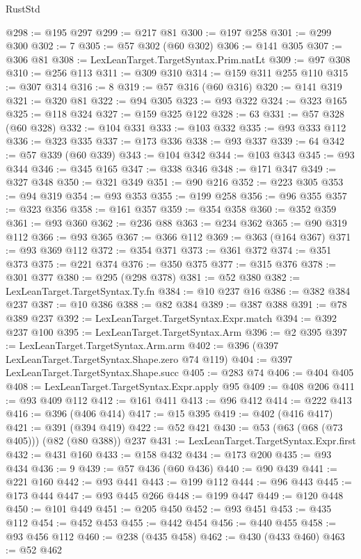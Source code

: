 \begin{lexlean}{RustStd}
\begin{coremodule}
@298 := @195 @297
@299 := @217 @81
@300 := @197 @258
@301 := @299 @300
@302 := 7
@305 := @57 @302 (@60 @302)
@306 := @141 @305
@307 := @306 @81
@308 := LexLeanTarget.TargetSyntax.Prim.natLt
@309 := @97 @308
@310 := @256 @113
@311 := @309 @310
@314 := @159 @311 @255 @110
@315 := @307 @314
@316 := 8
@319 := @57 @316 (@60 @316)
@320 := @141 @319
@321 := @320 @81
@322 := @94 @305
@323 := @93 @322
@324 := @323 @165
@325 := @118 @324
@327 := @159 @325 @122
@328 := 63
@331 := @57 @328 (@60 @328)
@332 := @104 @331
@333 := @103 @332
@335 := @93 @333 @112
@336 := @323 @335
@337 := @173 @336
@338 := @93 @337
@339 := 64
@342 := @57 @339 (@60 @339)
@343 := @104 @342
@344 := @103 @343
@345 := @93 @344
@346 := @345 @165
@347 := @338 @346
@348 := @171 @347
@349 := @327 @348
@350 := @321 @349
@351 := @90 @216
@352 := @223 @305
@353 := @94 @319
@354 := @93 @353
@355 := @199 @258
@356 := @96 @355
@357 := @323 @356
@358 := @161 @357
@359 := @354 @358
@360 := @352 @359
@361 := @93 @360
@362 := @236 @88
@363 := @234 @362
@365 := @90 @319 @112
@366 := @93 @365
@367 := @366 @112
@369 := @363 (@164 @367)
@371 := @93 @369 @112
@372 := @354 @371
@373 := @361 @372
@374 := @351 @373
@375 := @221 @374
@376 := @350 @375
@377 := @315 @376
@378 := @301 @377
@380 := @295 (@298 @378)
@381 := @52 @380
@382 := LexLeanTarget.TargetSyntax.Ty.fn
@384 := @10 @237 @16
@386 := @382 @384 @237
@387 := @10 @386
@388 := @82 @384
@389 := @387 @388
@391 := @78 @389 @237
@392 := LexLeanTarget.TargetSyntax.Expr.match
@394 := @392 @237 @100
@395 := LexLeanTarget.TargetSyntax.Arm
@396 := @2 @395
@397 := LexLeanTarget.TargetSyntax.Arm.arm
@402 := @396 (@397 LexLeanTarget.TargetSyntax.Shape.zero @74 @119)
@404 := @397 LexLeanTarget.TargetSyntax.Shape.succ
@405 := @283 @74
@406 := @404 @405
@408 := LexLeanTarget.TargetSyntax.Expr.apply @95
@409 := @408 @206
@411 := @93 @409 @112
@412 := @161 @411
@413 := @96 @412
@414 := @222 @413
@416 := @396 (@406 @414)
@417 := @15 @395
@419 := @402 (@416 @417)
@421 := @391 (@394 @419)
@422 := @52 @421
@430 := @53 (@63 (@68 (@73 @405))) (@82 (@80 @388)) @237
@431 := LexLeanTarget.TargetSyntax.Expr.first
@432 := @431 @160
@433 := @158 @432
@434 := @173 @200
@435 := @93 @434
@436 := 9
@439 := @57 @436 (@60 @436)
@440 := @90 @439
@441 := @221 @160
@442 := @93 @441
@443 := @199 @112
@444 := @96 @443
@445 := @173 @444
@447 := @93 @445 @266
@448 := @199 @447
@449 := @120 @448
@450 := @101 @449
@451 := @205 @450
@452 := @93 @451
@453 := @435 @112
@454 := @452 @453
@455 := @442 @454
@456 := @440 @455
@458 := @93 @456 @112
@460 := @238 (@435 @458)
@462 := @430 (@433 @460)
@463 := @52 @462

\end{coremodule}
\end{lexlean}
